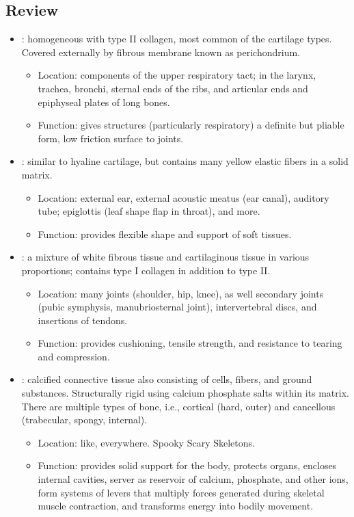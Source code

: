\begin{itemize}
  \subsection{Review}
  \begin{itemize}
    \item {}: homogeneous with type II collagen, most common of the cartilage types. Covered externally by fibrous membrane known as perichondrium. 
    \begin{itemize}
      \item Location: components of the upper respiratory tact; in the larynx, trachea, bronchi, sternal ends of the ribs, and articular ends and epiphyseal plates of long bones.
      \item Function: gives structures (particularly respiratory) a definite but pliable form, low friction surface to joints.
    \end{itemize}
    \item {}: similar to hyaline cartilage, but contains many yellow elastic fibers in a solid matrix. 
    \begin{itemize}
      \item Location: external ear, external acoustic meatus (ear canal), auditory tube; epiglottis (leaf shape flap in throat), and more.
      \item Function: provides flexible shape and support of soft tissues.
    \end{itemize}
    \item {}: a mixture of white fibrous tissue and cartilaginous tissue in various proportions; contains type I collagen in addition to type II\@.
    \begin{itemize}
      \item Location: many joints (shoulder, hip, knee), as well secondary joints (pubic symphysis, manubriosternal joint), intervertebral discs, and insertions of tendons.
      \item Function: provides cushioning, tensile strength, and resistance to tearing and compression.
    \end{itemize}
    \item {}: calcified connective tissue also consisting of cells, fibers, and ground substances. Structurally rigid using calcium phosphate salts within its matrix. There are multiple types of bone, i.e., cortical (hard, outer) and cancellous (trabecular, spongy, internal). 
    \begin{itemize}
      \item Location: like, everywhere. Spooky Scary Skeletons. 
      \item Function: provides solid support for the body, protects organs, encloses internal cavities, server as reservoir of calcium, phosphate, and other ions, form systems of levers that multiply forces generated during skeletal muscle contraction, and transforms energy into bodily movement.
    \end{itemize}
  \end{itemize}
  

\end{itemize}
